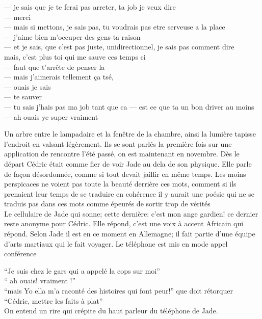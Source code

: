\documentclass{article}
\begin{document}
--- je sais que je te ferai pas arreter, ta job je veux dire\\
--- merci\\
--- mais si mettons, je sais pas, tu voudrais pas etre serveuse a la place\\
--- j'aime bien m'occuper des gens ta raison\\
--- et je sais, que c'est pas juste, unidirectionnel, je sais pas comment dire\\
mais, c'est plus toi qui me sauve ces temps ci\\
--- faut que t'arrête de penser la\\
--- mais j'aimerais tellement ça tsé,\\
--- ouais je sais\\
--- te sauver\\
--- tu sais j'hais pas ma job tant que ca
--- est ce que ta un bon driver au moins
--- ah ouais ye super vraiment


Un arbre entre le lampadaire et la fenêtre de la chambre, ainsi la lumière
tapisse l'endroit en valsant légèrement. Ils se sont parlés la première fois sur
une application de rencontre l'été passé, on est maintenant en novembre. Dès le
départ Cédric était comme fier de voir Jade au dela de son physique. Elle parle
de façon désordonnée, comme si tout devait jaillir en même temps. Les moins
perspicaces ne voient pas toute la beauté derrière ces mots, comment si ils
prenaient leur temps de se traduire en cohérence il y aurait une poésie qui ne
se traduis pas dans ces mots comme épeurés de sortir trop de vérités\\


Le cellulaire de Jade qui sonne; cette dernière: c'est mon ange gardien!
ce dernier reste anonyme pour Cédric. Elle répond, c'est une voix à accent
Africain qui répond. Selon Jade il est en ce moment en Allemagne; il fait partie
d'une équipe d'arts martiaux qui le fait voyager. Le téléphone est mis en mode
appel conférence

``Je suis chez le gars qui a appelé la cops sur moi''\\
`` ah ouais! vraiment !''\\
``mais Yo ella m'a raconté des histoires qui font peur!''  que doit rétorquer\\
``Cédric, mettre les faits à plat''\\
On entend un rire qui crépite du haut parleur du téléphone de Jade.

\clearpage
\end{document}
